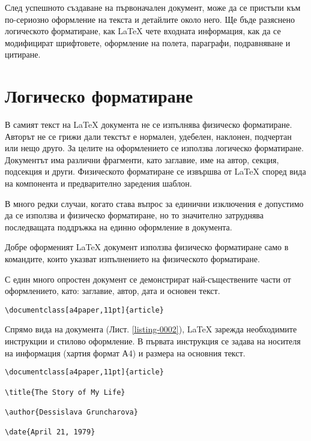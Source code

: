 След успешното създаване на първоначален документ, може да се пристъпи към по-сериозно оформление на текста и детайлите около него. Ще бъде разяснено логическото форматиране, как LaTeX чете входната информация, как да се модифицират шрифтовете, оформление на полета, параграфи, подравняване и цитиране.

\section{Логическо форматиране}

В самият текст на LaTeX документа не се изпълнява физическо форматиране. Авторът не се грижи дали текстът е нормален, удебелен, наклонен, подчертан или нещо друго. За целите на оформлението се използва логическо форматиране. Документът има различни фрагменти, като заглавие, име на автор, секция, подсекция и други. Физическото форматиране се извършва от LaTeX според вида на компонента и предварително заредения шаблон. 

В много редки случаи, когато става въпрос за единични изключения е допустимо да се използва и физическо форматиране, но то значително затруднява последващата поддръжка на единно оформление в документа.

Добре оформеният LaTeX документ използва физическо форматиране само в командите, които указват изпълнението на физическото форматиране.

С един много опростен документ се демонстрират най-съществените части от оформлението, като: заглавие, автор, дата и основен текст.

\begin{lstlisting}[language={[LaTeX]TeX}, caption=Инструкция за вида на документа, label=listing-0002]
\documentclass[a4paper,11pt]{article}
\end{lstlisting}

Спрямо вида на документа (Лист. \ref{listing-0002}), LaTeX зарежда необходимите инструкции и стилово оформление. В първата инструкция се задава на носителя на информация (хартия формат А4) и размера на основния текст. 

\begin{lstlisting}[language={[LaTeX]TeX}, caption={Добавяне на заглавие, автор и дата}, label=listing-0003]
\documentclass[a4paper,11pt]{article}

\title{The Story of My Life}

\author{Dessislava Gruncharova}

\date{April 21, 1979}
\end{lstlisting}

